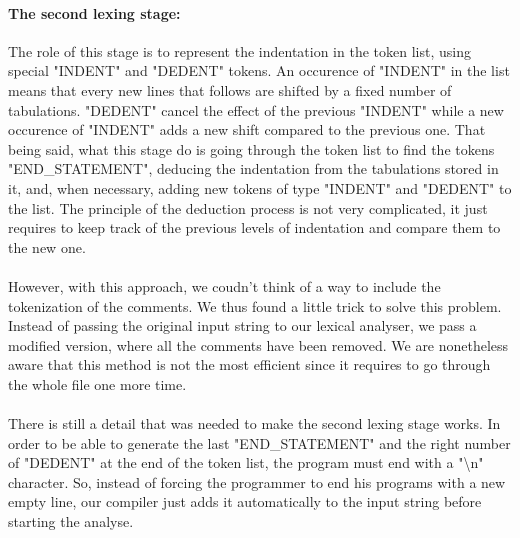 \documentclass[12pt,a4paper]{article}
\begin{document}
\paragraph{The second lexing stage:}
The role of this stage is to represent the indentation in the token list, using special "INDENT" and "DEDENT" tokens. An occurence of "INDENT" in the list means that every new lines that follows are shifted by a fixed number of tabulations. "DEDENT" cancel the effect of the previous "INDENT" while a new occurence of "INDENT" adds a new shift compared to the previous one. That being said, what this stage do is going through the token list to find the tokens "END\_STATEMENT", deducing the indentation from the tabulations stored in it, and, when necessary, adding new tokens of type "INDENT" and "DEDENT" to the list. The principle of the deduction process is not very complicated, it just requires to keep track of the previous levels of indentation and compare them to the new one.

\paragraph{}
However, with this approach, we coudn't think of a way to include the tokenization of the comments. We thus found a little trick to solve this problem. Instead of passing the original input string to our lexical analyser, we pass a modified version, where all the comments have been removed. We are nonetheless aware that this method is not the most efficient since it requires to go through the whole file one more time.

\paragraph{}
There is still a detail that was needed to make the second lexing stage works. In order to be able to generate the last "END\_STATEMENT" and the right number of "DEDENT" at the end of the token list, the program must end with a "\textbackslash n" character. So, instead of forcing the programmer to end his programs with a new empty line, our compiler just adds it automatically to the input string before starting the analyse.
\end{document}
